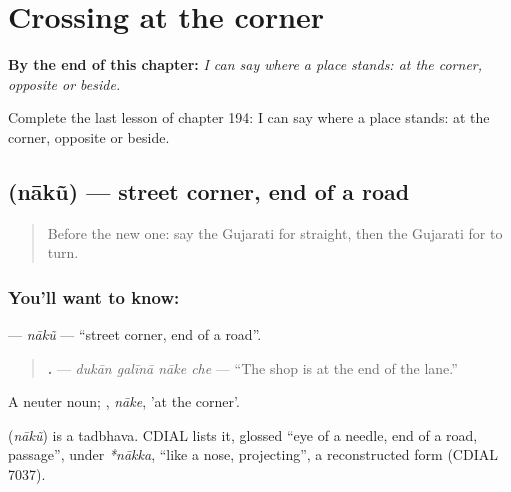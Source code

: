 
\chapter{Crossing at the corner}
\label{ch:gu-crossing-at-the-corner}

\begin{chapteropening}
\textbf{By the end of this chapter:} \emph{I can say where a place stands: at the corner, opposite or beside.}

Complete the last lesson of chapter 194: I can say where a place stands: at the corner, opposite or beside.
\end{chapteropening}

\section[\texorpdfstring{\gu{નાકું} (nākũ)}{નાકું (nākũ)}]{ (nākũ) — street corner, end of a road}

\label{lesson:GU-C194-naku}



\begin{quote}
Before the new one: say the Gujarati for straight, then the Gujarati for to turn.
\end{quote}

\subsection*{You'll want to know: }
\textbf{} — \emph{nākũ} — \textquotedblleft{}street corner, end of a road\textquotedblright{}.

\begin{quote}
\textbf{   .} — \emph{dukān galīnā nāke che} — \textquotedblleft{}The shop is at the end of the lane.\textquotedblright{}
\end{quote}

A neuter noun; \textbf{}, \emph{nāke}, 'at the corner'.

\begin{cousinweb}
\textbf{} (\emph{nākũ}) is a tadbhava. CDIAL lists it, glossed \textquotedblleft{}eye of a needle, end of a road, passage\textquotedblright{}, under \emph{*nākka}, \textquotedblleft{}like a nose, projecting\textquotedblright{}, a reconstructed form (CDIAL 7037).
\end{cousinweb}

